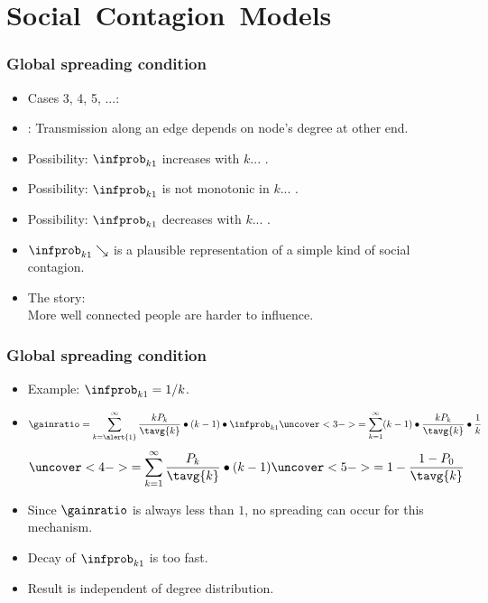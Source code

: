 \section{Social\ Contagion\ Models}

\begin{frame}
  \frametitle{Global spreading condition}

  \begin{itemize}
  \item<1->
    \alert{Cases 3, 4, 5, ...:}
  \item<3->
    : Transmission along an edge depends on
    node's degree at other end.
  \item<4->
    Possibility: $\infprob_{k1}$ increases with $k$...
    .
  \item<6->
    Possibility: $\infprob_{k1}$ is not monotonic in $k$...
    .
  \item<8->
    Possibility: $\infprob_{k1}$ decreases with $k$...
    .
  \item<9->
    $\infprob_{k1} \searrow$ is a plausible representation
    of a simple kind of social contagion.
  \item<10->
    \alert{The story:}\\
    More well connected people are harder to influence.
  \end{itemize}

\end{frame}

\begin{frame}
  \frametitle{Global spreading condition}

  \begin{itemize}
  \item<1-> 
    \alert{Example:} $\infprob_{k1}=1/k$.
  \item<2-> 
    $$
    \gainratio
    =
    \sum_{k=\alert{1}}^{\infty}
    \frac{kP_k}{\tavg{k}}
    \bullet
    (k-1)
    \bullet
    \infprob_{k1}
    \uncover<3->{
      =
      \sum_{k=1}^{\infty}
      (k-1)
      \bullet
      \frac{kP_k}{\tavg{k}}
      \bullet
      \frac{1}{k}
    }
    $$
    $$
    \uncover<4->{
      =
      \sum_{k=1}^{\infty}
      \frac{P_k}{\tavg{k}}
      \bullet
      (k-1)
    }
    \uncover<5->{
      =
      1 - \frac{1-P_0}{\tavg{k}}
    }
    $$
  \item<7->
    Since $\gainratio$ is always less than $1$, no spreading
    can occur for this mechanism.
  \item<8->
    Decay of $\infprob_{k1}$ is too fast.
  \item<9->
    Result is independent of degree distribution.
  \end{itemize}

\end{frame}

